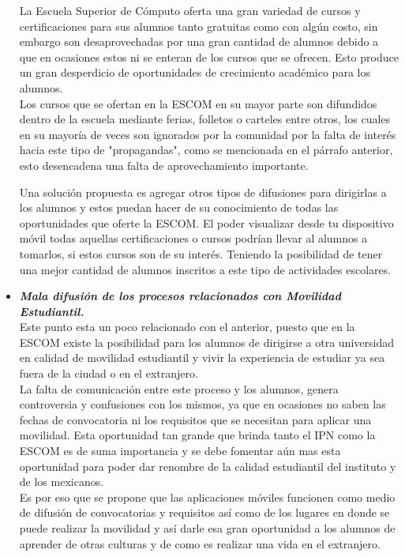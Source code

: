 \begin{itemize}
		La Escuela Superior de Cómputo oferta una gran variedad de cursos y certificaciones para sus alumnos tanto gratuitas como con algún costo, sin embargo son desaprovechadas por una gran cantidad de alumnos debido a que en ocasiones estos ni se enteran de los cursos que se ofrecen. Esto produce un gran desperdicio de oportunidades de crecimiento académico para los alumnos.\\
		
		Los cursos que se ofertan en la ESCOM en su mayor parte son difundidos dentro de la escuela mediante ferias, folletos o carteles entre otros, los cuales en su mayoría de veces son ignorados por la comunidad por la falta de interés hacia este tipo de "propagandas", como se mencionada en el párrafo anterior, esto desencadena una falta de aprovechamiento importante.
		
		Una solución propuesta es agregar otros tipos de difusiones para dirigirlas a los alumnos y estos puedan hacer de su conocimiento de todas las oportunidades que oferte la ESCOM. El poder visualizar desde tu dispositivo móvil todas aquellas certificaciones o cursos podrían llevar al alumnos a tomarlos, si estos cursos son de su interés. Teniendo la posibilidad de tener una mejor cantidad de alumnos inscritos a este tipo de actividades escolares.\\ 
		
		
		
		\item \textbf{\textit{Mala difusión de los procesos relacionados con Movilidad Estudiantil.}}\\
		
		Este punto esta un poco relacionado con el anterior, puesto que en la ESCOM existe la posibilidad para los alumnos de dirigirse a otra universidad en calidad de movilidad estudiantil y vivir la experiencia de estudiar ya sea fuera de la ciudad o en el extranjero. \\
		
		La falta de comunicación entre este proceso y los alumnos, genera controversia y confusiones con los mismos, ya que en ocasiones no saben las fechas de convocatoria ni los requisitos que se necesitan para aplicar una movilidad. Esta oportunidad tan grande que brinda tanto el IPN como la ESCOM es de suma importancia y se debe fomentar aún mas esta oportunidad para poder dar renombre de la calidad estudiantil del instituto y de los mexicanos.\\
		
		Es por eso que se propone que las aplicaciones móviles funcionen como medio de difusión de convocatorias y requisitos así como de los lugares en donde se puede realizar la movilidad y así darle esa gran oportunidad a los alumnos de aprender de otras culturas y de como es realizar una vida en el extranjero.\\
		
	\end{itemize}
	
